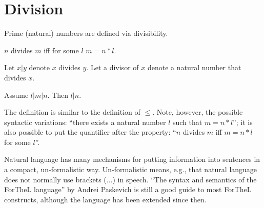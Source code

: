 \documentclass{stex}
\begin{document}
\section{Division}

Prime (natural) numbers are defined via divisibility.

\begin{forthel}

\begin{definition}
  $n$ divides $m$ iff for some $l$ $m = n * l$.
\end{definition}

Let $x | y$ denote $x$ divides $y$.
Let a divisor of $x$ denote a natural number
that divides $x$.

\begin{lemma} Assume $l | m | n$. Then $l | n$.
\end{lemma}

\end{forthel}

The definition is similar to the definition of $\leq$.
Note, however, the possible syntactic variations:
``there exists a natural number $l$ such that
$m = n * l$''; it is also possible
to put the quantifier after the property:
``$n$ divides $m$ iff $m = n * l$ for some $l$''.

Natural language has many mechanisms for putting
information into sentences in a compact, un-formalistic way.
Un-formalistic means, e.g., that natural language
does not normally use brackets (...) in speech.
``The syntax and semantics of the ForTheL language'' by Andrei
Paskevich is still a good guide to most ForTheL constructs, although
the language has been extended since then.
\end{document}
